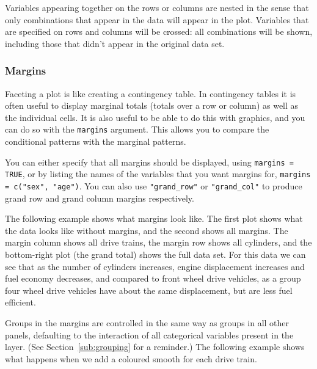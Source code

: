 Variables appearing together on the rows or columns are nested in the sense that only combinations that appear in the data will appear in the plot.  Variables that are specified on rows and columns will be crossed: all combinations will be shown, including those that didn't appear in the original data set.

\subsubsection{Margins}\label{sub:margins}

Faceting a plot is like creating a contingency table.  In contingency tables it is often useful to display marginal totals (totals over a row or column) as well as the individual cells.  It is also useful to be able to do this with graphics, and you can do so with the {\tt margins} argument.  This allows you to compare the conditional patterns with the marginal patterns.

You can either specify that all margins should be displayed, using {\tt margins = TRUE}, or by listing the names of the variables that you want margins for, {\tt margins = c("sex", "age")}.  You can also use \verb|"grand_row"| or \verb|"grand_col"| to produce grand row and grand column margins respectively.  

The following example shows what margins look like.  The first plot shows what the data looks like without margins, and the second shows all margins.  The margin column shows all drive trains, the margin row shows all cylinders, and the bottom-right plot (the grand total) shows the full data set.  For this data we can see that as the number of cylinders increases, engine displacement increases and fuel economy decreases, and compared to front wheel drive vehicles, as a group four wheel drive vehicles have about the same displacement, but are less fuel efficient.

% 


Groups in the margins are controlled in the same way as groups in all other panels, defaulting to the interaction of all categorical variables present in the layer.  (See Section~\ref{sub:grouping} for a reminder.)  The following example shows what happens when we add a coloured smooth for each drive train. 

% 


